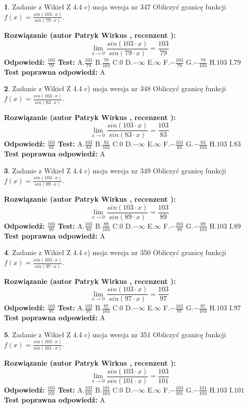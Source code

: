 \documentclass[12pt, a4paper]{article}
\theoremstyle{definition} %
\newtheorem{zad}{}
\newcommand{\zadStart}[1]{\begin{zad}#1\newline}
\newcommand{\zadStop}{\end{zad}}
\newcommand{\rozwStart}[2]{\noindent \textbf{Rozwiązanie (autor #1 , recenzent #2): }\newline}
\newcommand{\rozwStop}{\newline}
\newcommand{\odpStart}{\noindent \textbf{Odpowiedź:}\newline}
\newcommand{\odpStop}{\newline}
\newcommand{\testStart}{\noindent \textbf{Test:}\newline}
\newcommand{\testStop}{\newline}
\newcommand{\kluczStart}{\noindent \textbf{Test poprawna odpowiedź:}\newline}
\newcommand{\kluczStop}{\newline}
\begin{document}
\zadStart{Zadanie z Wikieł Z 4.4 c) moja wersja nr 347}
Obliczyć granicę funkcji $f(x)=\frac{sin(103\cdot x)}{sin(79\cdot x)}$.
\zadStop
\rozwStart{Patryk Wirkus}{}
$$\lim\limits_{x\to 0}\frac{sin(103\cdot x)}{sin(79\cdot x)}=
\frac{103}{79}$$
\rozwStop
\odpStart
$\frac{103}{79}$
\odpStop
\testStart
A.$\frac{103}{79}$
B.$\frac{79}{103}$
C.$0$
D.$-\infty$
E.$\infty$
F.$-\frac{103}{79}$
G.$-\frac{79}{103}$
H.$103$
I.$79$
\testStop
\kluczStart
A
\kluczStop



\zadStart{Zadanie z Wikieł Z 4.4 c) moja wersja nr 348}
Obliczyć granicę funkcji $f(x)=\frac{sin(103\cdot x)}{sin(83\cdot x)}$.
\zadStop
\rozwStart{Patryk Wirkus}{}
$$\lim\limits_{x\to 0}\frac{sin(103\cdot x)}{sin(83\cdot x)}=
\frac{103}{83}$$
\rozwStop
\odpStart
$\frac{103}{83}$
\odpStop
\testStart
A.$\frac{103}{83}$
B.$\frac{83}{103}$
C.$0$
D.$-\infty$
E.$\infty$
F.$-\frac{103}{83}$
G.$-\frac{83}{103}$
H.$103$
I.$83$
\testStop
\kluczStart
A
\kluczStop



\zadStart{Zadanie z Wikieł Z 4.4 c) moja wersja nr 349}
Obliczyć granicę funkcji $f(x)=\frac{sin(103\cdot x)}{sin(89\cdot x)}$.
\zadStop
\rozwStart{Patryk Wirkus}{}
$$\lim\limits_{x\to 0}\frac{sin(103\cdot x)}{sin(89\cdot x)}=
\frac{103}{89}$$
\rozwStop
\odpStart
$\frac{103}{89}$
\odpStop
\testStart
A.$\frac{103}{89}$
B.$\frac{89}{103}$
C.$0$
D.$-\infty$
E.$\infty$
F.$-\frac{103}{89}$
G.$-\frac{89}{103}$
H.$103$
I.$89$
\testStop
\kluczStart
A
\kluczStop



\zadStart{Zadanie z Wikieł Z 4.4 c) moja wersja nr 350}
Obliczyć granicę funkcji $f(x)=\frac{sin(103\cdot x)}{sin(97\cdot x)}$.
\zadStop
\rozwStart{Patryk Wirkus}{}
$$\lim\limits_{x\to 0}\frac{sin(103\cdot x)}{sin(97\cdot x)}=
\frac{103}{97}$$
\rozwStop
\odpStart
$\frac{103}{97}$
\odpStop
\testStart
A.$\frac{103}{97}$
B.$\frac{97}{103}$
C.$0$
D.$-\infty$
E.$\infty$
F.$-\frac{103}{97}$
G.$-\frac{97}{103}$
H.$103$
I.$97$
\testStop
\kluczStart
A
\kluczStop



\zadStart{Zadanie z Wikieł Z 4.4 c) moja wersja nr 351}
Obliczyć granicę funkcji $f(x)=\frac{sin(103\cdot x)}{sin(101\cdot x)}$.
\zadStop
\rozwStart{Patryk Wirkus}{}
$$\lim\limits_{x\to 0}\frac{sin(103\cdot x)}{sin(101\cdot x)}=
\frac{103}{101}$$
\rozwStop
\odpStart
$\frac{103}{101}$
\odpStop
\testStart
A.$\frac{103}{101}$
B.$\frac{101}{103}$
C.$0$
D.$-\infty$
E.$\infty$
F.$-\frac{103}{101}$
G.$-\frac{101}{103}$
H.$103$
I.$101$
\testStop
\kluczStart
A
\kluczStop
\end{document}
